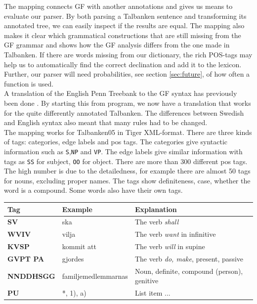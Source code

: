 \documentclass{report}
\begin{document}
The mapping connects GF with another annotations and gives us means to evaluate
our parser. By both parsing a Talbanken sentence and transforming its annotated tree, we can
easily inspect if the results are equal.
The mapping also makes it clear which grammatical constructions that are still missing
from the GF grammar and shows how the GF analysis differs from the one made
in Talbanken.
If there are words missing from our dictionary, the rich
POS-tags may help us to automatically find the correct declination and add it to the
lexicon. Further, our parser will need probabilities, see section
\ref{sec:future}, of how often a function is used.\\

A translation of the English Penn Treebank to the GF syntax has previously been done \cite{gfpenn}.
By starting this from program, we now have
a translation that works for the quite differently annotated Talbanken. The differences between
Swedish and English syntax also meant that many rules had to be changed.\\

The mapping works for Talbanken05 in Tiger XML-format. There are three kinds of
tags: categories, edge labels and pos tags. 
The categories give syntactic information such as \verb|S|,\verb|NP| and \verb|VP|.
The edge labels give similar information with tags as \verb|SS| for subject, 
\verb|OO| for object. There are more than 300 different pos tags. The high
number is due to the detailedness, for example there are almost 50 tags for
nouns, excluding proper names. The tags show definiteness, case, whether the
word is a compound. Some words also have their own tags.\\

\begin{tabular}{lll}
\textbf{Tag} & \textbf{Example} & \textbf{Explanation} \\
\hline
\textbf{SV} & ska & The verb \emph{shall}\\
\textbf{WVIV} & vilja & The verb \emph{want} in infinitive\\
\textbf{KVSP} & kommit att & The verb \emph{will} in supine\\
\textbf{GVPT  PA} & gjordes & The verb \emph{do, make}, present, passive \\
\textbf{NNDDHSGG} & familjemedlemmarnas & Noun, definite, compound (person), genitive \\
\textbf{PU} & *, 1), a) & List item  ...\\
\end{tabular}\\
\end{document}
